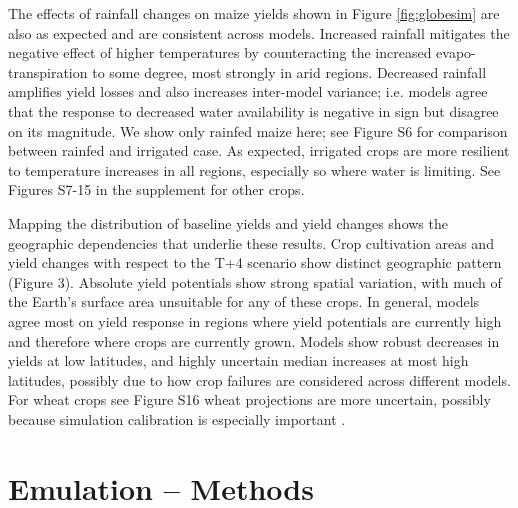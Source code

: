 \documentclass[esd, manuscript]{copernicus} %
\begin{document}
The effects of rainfall changes on maize yields shown in Figure \ref{fig:globesim} are also as expected and are consistent across models. Increased rainfall mitigates the negative effect of higher temperatures by counteracting the increased evapo-transpiration to some degree, most strongly in arid regions.
Decreased rainfall amplifies yield losses and also increases inter-model variance; i.e. models agree that the response to decreased water availability is negative in sign but disagree on its magnitude.
We show only rainfed maize here; see Figure S6 for comparison between rainfed and irrigated case. As expected, irrigated crops are more resilient to temperature increases in all regions, especially so where water is limiting. See Figures S7-15 in the supplement for other crops.   

Mapping the distribution of baseline yields and yield changes shows the geographic dependencies that underlie these results. Crop cultivation areas and yield changes with respect to the T+4 scenario show distinct geographic pattern (Figure 3). Absolute yield potentials show strong spatial variation, with much of the Earth's surface area unsuitable for any of these crops. In general, models agree most on yield response in regions where yield potentials are currently high and therefore where crops are currently grown. Models show robust decreases in yields at low latitudes, and highly uncertain median increases at most high latitudes, possibly due to how crop failures are considered across different models. For wheat crops see Figure S16 wheat projections are more uncertain, possibly because simulation calibration is especially important \citep[e.g.][]{Asseng2013}.

\section{Emulation -- Methods}
\label{S:4}
\end{document}
